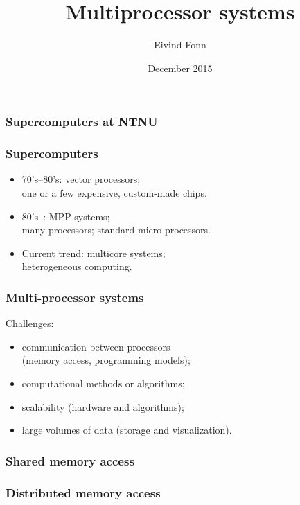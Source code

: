 

\title{Multiprocessor systems}
\author{Eivind Fonn}
\date{December 2015}
\maketitle

\begin{frame}
  \frametitle{Supercomputers at NTNU}
  \begin{center}
    \scalebox{0.8}{
      
    }
  \end{center}
\end{frame}

\begin{frame}
  \frametitle{Supercomputers}
  \begin{itemize}
  \item 70's--80's: vector processors; \\
    one or a few expensive, custom-made chips.
  \item 80's--: MPP systems; \\
    many processors; standard micro-processors.
  \item Current trend: multicore systems; \\
    heterogeneous computing.
  \end{itemize}
\end{frame}

\begin{frame}
  \frametitle{Multi-processor systems}
  Challenges:
  \begin{itemize}
  \item communication between processors \\
    (memory access, programming models);
  \item computational methods or algorithms;
  \item scalability (hardware and algorithms);
  \item large volumes of data (storage and visualization).
  \end{itemize}
\end{frame}

\begin{frame}
  \frametitle{Shared memory access}
  \begin{center}
    
  \end{center}
\end{frame}

\begin{frame}
  \frametitle{Distributed memory access}
  \begin{center}
    
  \end{center}
\end{frame}

